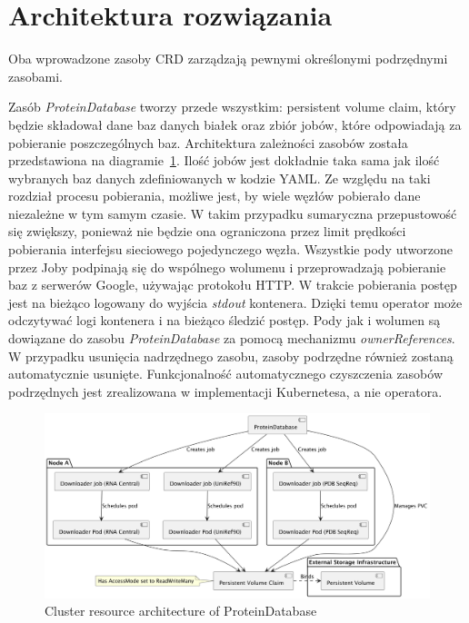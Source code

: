 \section{Architektura rozwiązania}

Oba wprowadzone zasoby CRD zarządzają pewnymi określonymi podrzędnymi zasobami.

Zasób \textit{ProteinDatabase} tworzy przede wszystkim: persistent volume claim, który będzie składował dane baz danych białek oraz zbiór jobów, które odpowiadają za pobieranie poszczególnych baz.
Architektura zależności zasobów została przedstawiona na diagramie~\ref{fig:proteindatabase}.
Ilość jobów jest dokładnie taka sama jak ilość wybranych baz danych zdefiniowanych w kodzie YAML.
Ze względu na taki rozdział procesu pobierania, możliwe jest, by wiele węzłów pobierało dane niezależne w tym samym czasie.
W takim przypadku sumaryczna przepustowość się zwiększy, ponieważ nie będzie ona ograniczona przez limit prędkości pobierania interfejsu sieciowego pojedynczego węzła.
Wszystkie pody utworzone przez Joby podpinają się do wspólnego wolumenu i przeprowadzają pobieranie baz z serwerów Google, używając protokołu HTTP.
W trakcie pobierania postęp jest na bieżąco logowany do wyjścia \textit{stdout} kontenera.
Dzięki temu operator może odczytywać logi kontenera i na bieżąco śledzić postęp.
Pody jak i wolumen są dowiązane do zasobu \textit{ProteinDatabase} za pomocą mechanizmu \textit{ownerReferences}.
W przypadku usunięcia nadrzędnego zasobu, zasoby podrzędne również zostaną automatycznie usunięte.
Funkcjonalność automatycznego czyszczenia zasobów podrzędnych jest zrealizowana w implementacji Kubernetesa, a nie operatora.

\begin{figure}[htbp]
    \centering
    \includegraphics[width=\textwidth]{images/proteindatabase}
    \caption{Cluster resource architecture of ProteinDatabase}
    \label{fig:proteindatabase}
\end{figure}

